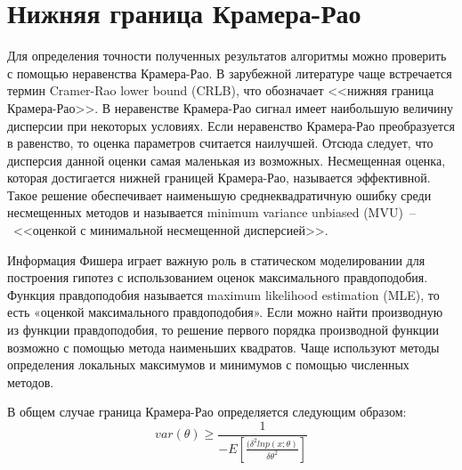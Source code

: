 \section{Нижняя граница Крамера-Рао} \label{sec:ch1/sec2}

Для определения точности полученных результатов алгоритмы можно проверить с помощью неравенства Крамера-Рао. В зарубежной литературе чаще встречается термин Cramer-Rao lower bound (CRLB), что обозначает <<нижняя граница Крамера-Рао>>. В неравенстве Крамера-Рао сигнал имеет наибольшую величину дисперсии при некоторых условиях. Если неравенство Крамера-Рао преобразуется в равенство, то оценка параметров считается наилучшей. Отсюда следует, что дисперсия данной оценки самая маленькая из возможных. 
Несмещенная оценка, которая достигается нижней границей Крамера-Рао, называется эффективной. Такое решение обеспечивает наименьшую среднеквадратичную ошибку среди несмещенных методов и называется minimum variance unbiased (MVU)~--~<<оценкой с минимальной несмещенной дисперсией>>.

Информация Фишера играет важную роль в статическом моделировании для построения гипотез с использованием оценок максимального правдоподобия. Функция правдоподобия называется maximum likelihood estimation (MLE), то есть «оценкой максимального правдоподобия». Если можно найти производную из функции правдоподобия, то решение первого порядка производной функции возможно с помощью метода наименьших квадратов. Чаще используют методы определения локальных максимумов и минимумов с помощью численных методов.

В общем случае граница Крамера-Рао определяется следующим образом:
\begin{equation}
	\label{eq:equation1}
	var(\theta)\geq\frac{1}{-E\left[\frac{(\delta^2 ln p(x;\theta)}{\delta\theta^2}\right]}
\end{equation}

